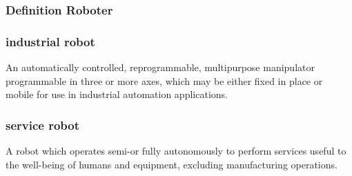 \subsubsection{Definition Roboter}
\begin{minipage}[t]{0.48\linewidth}
    \subsubsection{industrial robot}
    An automatically controlled, reprogrammable, multipurpose manipulator programmable in three or more axes, which may be either fixed in place or mobile for use in industrial automation applications.
\end{minipage}\hspace{0.04\linewidth}
\begin{minipage}[t]{0.48\linewidth}
    \subsubsection{service robot}
    A robot which operates semi-or fully autonomously to perform services useful to the well-being of humans and equipment, excluding manufacturing operations.
\end{minipage}
